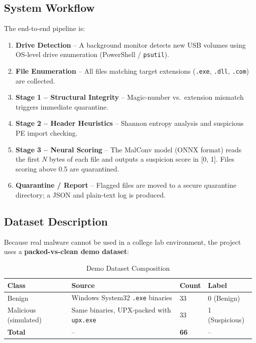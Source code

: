 \documentclass[12pt,a4paper]{article}
\begin{document}
\subsection{System Workflow}

The end-to-end pipeline is:

\begin{enumerate}
  \item \textbf{Drive Detection} -- A background monitor detects new USB
        volumes using OS-level drive enumeration (PowerShell / \texttt{psutil}).
  \item \textbf{File Enumeration} -- All files matching target extensions
        (\texttt{.exe}, \texttt{.dll}, \texttt{.com}) are collected.
  \item \textbf{Stage 1 -- Structural Integrity} -- Magic-number vs.\
        extension mismatch triggers immediate quarantine.
  \item \textbf{Stage 2 -- Header Heuristics} -- Shannon entropy analysis and
        suspicious PE import checking.
  \item \textbf{Stage 3 -- Neural Scoring} -- The MalConv model (ONNX format)
        reads the first \textit{N} bytes of each file and outputs a suspicion
        score in [0, 1].  Files scoring above 0.5 are quarantined.
  \item \textbf{Quarantine / Report} -- Flagged files are moved to a secure
        quarantine directory; a JSON and plain-text log is produced.
\end{enumerate}

\subsection{Dataset Description}

Because real malware cannot be used in a college lab environment, the project
uses a \textbf{packed-vs-clean demo dataset}:

\begin{table}[h!]
\centering
\caption{Demo Dataset Composition}
\renewcommand{\arraystretch}{1.3}
\begin{tabular}{L{3.5cm} L{4.5cm} C{2cm} C{3cm}}
\toprule
{}
\color{white}\textbf{Class} &
\color{white}\textbf{Source} &
\color{white}\textbf{Count} &
\color{white}\textbf{Label} \\
\midrule
Benign & Windows System32 \texttt{.exe} binaries & 33 & 0 (Benign) \\
\rowcolor{TableAlt}
Malicious (simulated) & Same binaries, UPX-packed with \texttt{upx.exe} & 33 & 1 (Suspicious) \\
\midrule
\textbf{Total} & -- & \textbf{66} & -- \\
\bottomrule
\end{tabular}
\end{table}
\end{document}
